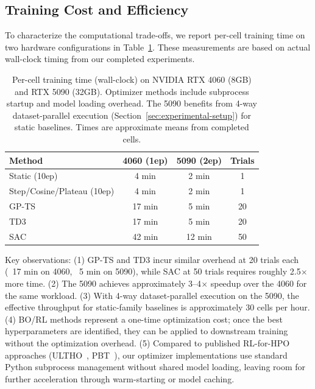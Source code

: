 \documentclass[11pt]{article}
\begin{document}
\subsection{Training Cost and Efficiency}

To characterize the computational trade-offs, we report per-cell training time on two hardware configurations in Table~\ref{tab:compute-cost}. These measurements are based on actual wall-clock timing from our completed experiments.

\begin{table}[h]
\centering
\small
\begin{tabular}{@{}lccc@{}}
\toprule
\textbf{Method} & \textbf{4060 (1ep)} & \textbf{5090 (2ep)} & \textbf{Trials} \\
\midrule
Static (10ep) & 4 min & 2 min & 1 \\
Step/Cosine/Plateau (10ep) & 4 min & 2 min & 1 \\
GP-TS & 17 min & 5 min & 20 \\
TD3 & 17 min & 5 min & 20 \\
SAC & 42 min & 12 min & 50 \\
\midrule
\end{tabular}
\caption{Per-cell training time (wall-clock) on NVIDIA RTX 4060 (8GB) and RTX 5090 (32GB). Optimizer methods include subprocess startup and model loading overhead. The 5090 benefits from 4-way dataset-parallel execution (Section~\ref{sec:experimental-setup}) for static baselines. Times are approximate means from completed cells.}
\label{tab:compute-cost}
\end{table}

Key observations: (1) GP-TS and TD3 incur similar overhead at 20 trials each (~17 min on 4060, ~5 min on 5090), while SAC at 50 trials requires roughly 2.5$\times$ more time. (2) The 5090 achieves approximately 3--4$\times$ speedup over the 4060 for the same workload. (3) With 4-way dataset-parallel execution on the 5090, the effective throughput for static-family baselines is approximately 30 cells per hour. (4) BO/RL methods represent a one-time optimization cost; once the best hyperparameters are identified, they can be applied to downstream training without the optimization overhead. (5) Compared to published RL-for-HPO approaches (ULTHO~\cite{yuan2025ultho}, PBT~\cite{jaderberg2017population}), our optimizer implementations use standard Python subprocess management without shared model loading, leaving room for further acceleration through warm-starting or model caching.
\end{document}
